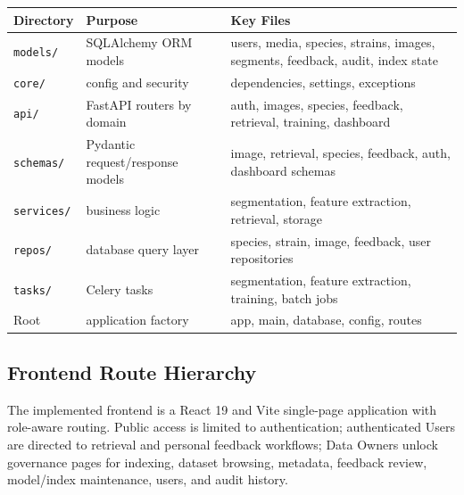 \begin{center}
\begin{tabular}{@{}p{3cm} p{4.5cm} p{6.5cm}@{}}
\toprule
\textbf{Directory} & \textbf{Purpose} & \textbf{Key Files} \\
\midrule
\texttt{models/} & SQLAlchemy ORM models & users, media, species, strains, images, segments, feedback, audit, index state \\
\texttt{core/} & config and security & dependencies, settings, exceptions \\
\texttt{api/} & FastAPI routers by domain & auth, images, species, feedback, retrieval, training, dashboard \\
\texttt{schemas/} & Pydantic request/response models & image, retrieval, species, feedback, auth, dashboard schemas \\
\texttt{services/} & business logic & segmentation, feature extraction, retrieval, storage \\
\texttt{repos/} & database query layer & species, strain, image, feedback, user repositories \\
\texttt{tasks/} & Celery tasks & segmentation, feature extraction, training, batch jobs \\
Root & application factory & app, main, database, config, routes \\
\bottomrule
\end{tabular}
\end{center}

\subsection{Frontend Route Hierarchy}\label{frontend-route-hierarchy}

The implemented frontend is a React 19 and Vite single-page application with role-aware routing. Public access is limited to authentication; authenticated Users are directed to retrieval and personal feedback workflows; Data Owners unlock governance pages for indexing, dataset browsing, metadata, feedback review, model/index maintenance, users, and audit history.

